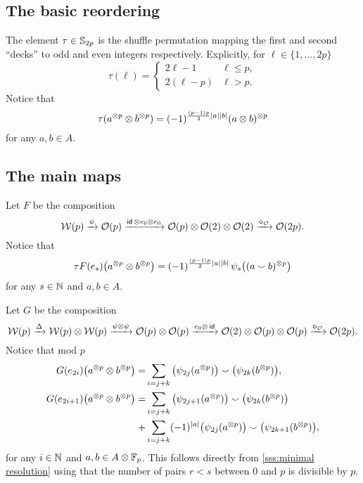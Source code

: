 \subsection{The basic reordering}\label{ss:reordering}

The element $\tau \in \mathbb{S}_{2p}$ is the shuffle permutation mapping the first and second ``decks'' to odd and even integers respectively.
Explicitly, for $\ell \in \{1,\dots,2p\}$
\begin{equation*}
	\tau(\ell) =
	\begin{cases}
		2\ell-1 & \ell \leq p, \\
		2(\ell-p) & \ell > p.
	\end{cases}
\end{equation*}
Notice that
\[
\tau(a^{\otimes p} \otimes b^{\otimes p}) = (-1)^{\frac{(p-1)p}{2}\lvert a\rvert\lvert b\rvert} (a \otimes b)^{\otimes p}
\]
for any $a,b \in A$.

\subsection{The main maps}\label{ss:main maps}

\sssec

Let $F$ be the composition
\[
\mathcal{W}(p) \xrightarrow{\psi} \mathcal{O}(p) \xrightarrow{\mathsf{id}\, \otimes e_0 \otimes e_0} \mathcal{O}(p) \otimes \mathcal{O}(2) \otimes \mathcal{O}(2) \xrightarrow{\bm{\circ}_{\mathcal{O}}} \mathcal{O}(2p).
\]
Notice that
\[
\tau F(e_s)\big(a^{\otimes p} \otimes b^{\otimes p}\big) =
(-1)^{\frac{(p-1)p}{2}\lvert a\rvert\lvert b\rvert} \, \psi_{s}\big((a \smallsmile b)^{\otimes p}\big)
\]
for any $s \in \mathbb{N}$ and $a,b \in A$.

\sssec

Let $G$ be the composition
\[
\mathcal{W}(p) \xrightarrow{\Delta}
\mathcal{W}(p) \otimes \mathcal{W}(p) \xrightarrow{\psi \otimes \psi}
\mathcal{O}(p) \otimes \mathcal{O}(p) \xrightarrow{e_0 \otimes\, \mathsf{id}}
\mathcal{O}(2) \otimes \mathcal{O}(p) \otimes \mathcal{O}(p) \xrightarrow{\bm{\circ}_{\mathcal{O}}}
\mathcal{O}(2p).
\]
Notice that mod $p$
\begin{equation*}
	\begin{split}
		G(e_{2i})\big(a^{\otimes p} \otimes b^{\otimes p}\big) =&
		\sum_{i=j+k}\big(\psi_{2j}(a^{\otimes p})\big) \smallsmile \big(\psi_{2k}(b^{\otimes p})\big), \\
		G(e_{2i+1})\big(a^{\otimes p} \otimes b^{\otimes p}\big) =&
		\sum_{i=j+k} \big(\psi_{2j+1}(a^{\otimes p})\big) \smallsmile \big(\psi_{2k}(b^{\otimes p})\big) \\ \ +&
		\sum_{i=j+k} (-1)^{\lvert a\rvert} \big(\psi_{2j}(a^{\otimes p})\big) \smallsmile \big(\psi_{2k+1}(b^{\otimes p})\big),
	\end{split}
\end{equation*}
for any $i \in \mathbb{N}$ and $a,b \in A \otimes {\mathbb{F}_p}$.
This follows directly from \cref{sss:minimal resolution} using that the number of pairs $r<s$ between $0$ and $p$ is divisible by $p$.

